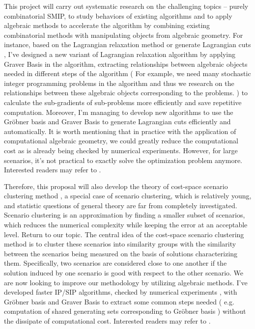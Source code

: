\documentclass{article}
\theoremstyle{plain}
\theoremstyle{definition}
\begin{document}
This project will carry out systematic research on the challenging topics -- purely combinatorial SMIP,  to study behaviors of existing algorithms and to apply algebraic methods to accelerate the algorithm by combining existing combinatorial methods with manipulating objects from algebraic geometry. For instance, based on the Lagrangian relaxation method \cite{Hemmecke and Schultz 2003} or generate Lagrangian cuts \cite{Generating Lagrangian Cuts},  I've designed a new variant of  Lagrangian relaxation algorithm by applying Graver Basis in the algorithm, extracting relationships between algebraic objects needed in different steps of the algorithm ( For example, we need many stochastic integer programming problems in the algorithm and thus we research on the relationships between these algebraic objects corresponding to the problems. ) to calculate the sub-gradients of sub-problems more efficiently and save repetitive computation. Moreover, I'm managing to develop new algorithms to use the Gröbner basis and Graver Basis to generate Lagrangian cuts efficiently and automatically. It is worth mentioning that in practice with the application of computational algebraic geometry, we could greatly reduce the computational cost as is already being checked by numerical experiments. However, for large scenarios, it's not practical to exactly solve the optimization problem anymore. Interested readers may refer to \cite{Yuchen4}.

Therefore, this proposal will also develop the theory of cost-space scenario clustering method \cite{Scenario Clustering}, a special case of scenario clustering, which is relatively young, and statistic questions of general theory are far from completely investigated. Scenario clustering is an approximation by finding a smaller subset of scenarios, which reduces the numerical complexity while keeping the error at an acceptable level. Return to our topic. The central idea of the cost-space scenario clustering method is to cluster these scenarios into similarity groups with the similarity between the scenarios being measured on the basis of solutions characterizing them. Specifically, two scenarios are considered close to one another if the solution induced by one scenario is good with respect to the other scenario. We are now looking to improve our methodology by utilizing algebraic methods. I've developed faster IP/SIP algorithms, checked by numerical experiments \cite{Yuchen2},  with Gröbner basis and Graver Basis to extract some common steps needed ( e.g. computation of shared generating sets corresponding to Gröbner basis  ) without the dissipate of computational cost. Interested readers may refer to \cite{Yuchen2}.
\end{document}
